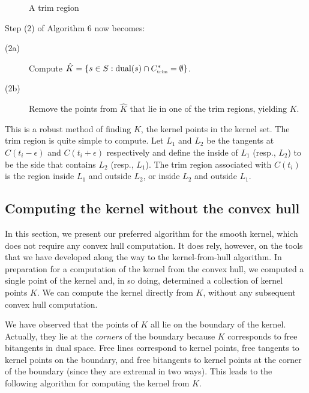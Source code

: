 \documentclass[12pt]{article}
\begin{document}
\begin{figure}[h]
\caption{A trim region}
\label{fig:trimregion}
\end{figure}

Step (2) of Algorithm 6 now becomes:

\begin{description}
\item[(2a)] Compute $\hat{K} = \{s \in S : \mbox{dual}(s) \cap C^*_{\mbox{\tiny{trim}}} = \emptyset\}$.
\item[(2b)] Remove the points from $\hat{K}$ that lie in one of the trim regions,
	yielding $K$.
\end{description}

This is a robust method of finding $K$, the kernel points in the kernel set.
The trim region is quite simple to compute.
Let $L_1$ and $L_2$ be the tangents at $C(t_i - \epsilon)$ and $C(t_i + \epsilon)$
respectively
and define the inside of $L_1$ (resp., $L_2$) 
to be the side that contains $L_2$ (resp., $L_1$).
The trim region associated with $C(t_i)$ 
is the region inside $L_1$ and outside $L_2$,
or inside $L_2$ and outside $L_1$.


\subsection{Computing the kernel without the convex hull}
\label{sec:nohull}

In this section, we present our preferred algorithm for the smooth kernel,
which does not require any convex hull computation.
It does rely, however, on the tools that we have developed along the way
to the kernel-from-hull algorithm.
In preparation for a computation of the kernel
from the convex hull, we computed a single point of the
kernel and, in so doing, determined a collection of kernel points $K$.
We can compute the kernel directly from $K$,
without any subsequent convex hull computation.

We have observed that the points of $K$ all lie on the boundary of the kernel.
Actually, they lie at the {\em corners} of the boundary because
$K$ corresponds to free bitangents in dual space.
Free lines correspond to kernel points, free tangents to kernel
points on the boundary, and free bitangents to kernel points at the
corner of the boundary (since they are extremal in two ways).
This leads to the following algorithm for computing the kernel from $K$.
\end{document}
